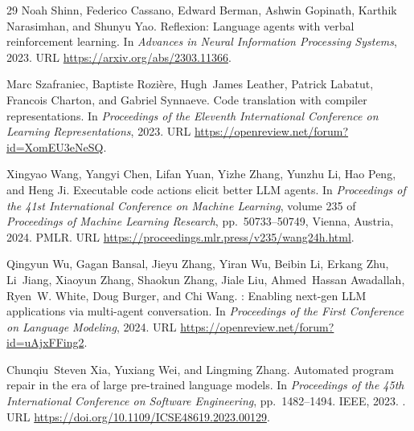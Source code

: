 \documentclass{article}
\begin{document}
\begin{thebibliography}{29}
Noah Shinn, Federico Cassano, Edward Berman, Ashwin Gopinath, Karthik
  Narasimhan, and Shunyu Yao.
\newblock Reflexion: Language agents with verbal reinforcement learning.
\newblock In \emph{Advances in Neural Information Processing Systems}, 2023.
\newblock URL \url{https://arxiv.org/abs/2303.11366}.

Marc Szafraniec, Baptiste Rozi{\`e}re, Hugh~James Leather, Patrick Labatut,
  Francois Charton, and Gabriel Synnaeve.
\newblock Code translation with compiler representations.
\newblock In \emph{Proceedings of the Eleventh International Conference on
  Learning Representations}, 2023.
\newblock URL \url{https://openreview.net/forum?id=XomEU3eNeSQ}.

Xingyao Wang, Yangyi Chen, Lifan Yuan, Yizhe Zhang, Yunzhu Li, Hao Peng, and
  Heng Ji.
\newblock Executable code actions elicit better {LLM} agents.
\newblock In \emph{Proceedings of the 41st International Conference on Machine
  Learning}, volume 235 of \emph{Proceedings of Machine Learning Research},
  pp.\  50733--50749, Vienna, Austria, 2024. PMLR.
\newblock URL \url{https://proceedings.mlr.press/v235/wang24h.html}.

Qingyun Wu, Gagan Bansal, Jieyu Zhang, Yiran Wu, Beibin Li, Erkang Zhu,
  Li~Jiang, Xiaoyun Zhang, Shaokun Zhang, Jiale Liu, Ahmed~Hassan Awadallah,
  Ryen~W. White, Doug Burger, and Chi Wang.
: Enabling next-gen {LLM} applications via multi-agent
  conversation.
\newblock In \emph{Proceedings of the First Conference on Language Modeling},
  2024.
\newblock URL \url{https://openreview.net/forum?id=uAjxFFing2}.

Chunqiu~Steven Xia, Yuxiang Wei, and Lingming Zhang.
\newblock Automated program repair in the era of large pre-trained language
  models.
\newblock In \emph{Proceedings of the 45th International Conference on Software
  Engineering}, pp.\  1482--1494. IEEE, 2023.
\newblock {}.
\newblock URL \url{https://doi.org/10.1109/ICSE48619.2023.00129}.


\end{thebibliography}
\end{document}
